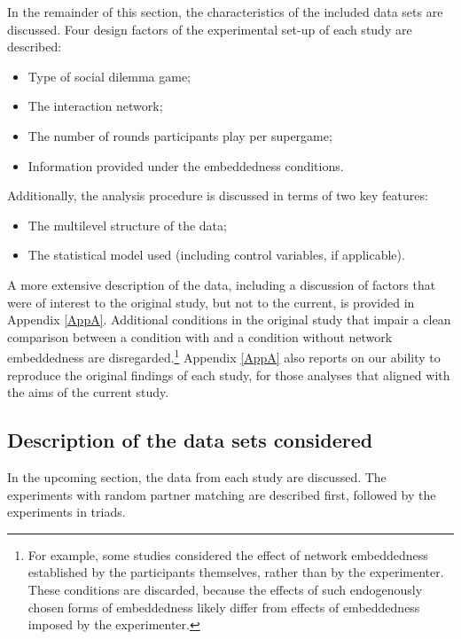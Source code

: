 \documentclass[
  11pt,
]{article}
\begin{document}
In the remainder of this section, the characteristics of the included data sets are discussed.
Four design factors of the experimental set-up of each study are described:
\setlength{\parindent}{0in}
\setlength{\leftskip}{0in}
\noindent

\begin{itemize}
  \item{Type of social dilemma game;}
  \item{The interaction network;}
  \item{The number of rounds participants play per supergame;}
  \item{Information provided under the embeddedness conditions.}
\end{itemize}

Additionally, the analysis procedure is discussed in terms of two key features:

\begin{itemize}
  \item{The multilevel structure of the data;}
  \item{The statistical model used (including control variables, if applicable).}
\end{itemize}
\setlength{\parindent}{0.2in}
\setlength{\leftskip}{0in}

A more extensive description of the data, including a discussion of factors that were of interest to the original study, but not to the current, is provided in Appendix \ref{AppA}.
Additional conditions in the original study that impair a clean comparison between a condition with and a condition without network embeddedness are disregarded.\footnote{
  For example, some studies considered the effect of network embeddedness established by the participants themselves, rather than by the experimenter. These conditions are discarded, because the effects of such endogenously chosen forms of embeddedness likely differ from effects of embeddedness imposed by the experimenter.}
Appendix \ref{AppA} also reports on our ability to reproduce the original findings of each study, for those analyses that aligned with the aims of the current study.

\hypertarget{description-of-the-data-sets-considered}{%
\subsection{Description of the data sets considered}\label{description-of-the-data-sets-considered}}

In the upcoming section, the data from each study are discussed. The experiments with random partner matching are described first, followed by the experiments in triads.
\end{document}
